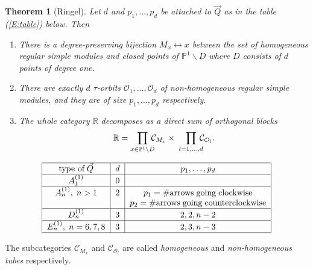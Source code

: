 \documentclass[a4paper,10pt]{amsart}
\newtheorem{theo}{\bf{Theorem}}[section]
\numberwithin{equation}{section}
\begin{document}
\vspace{.1in}

\begin{theo}[Ringel]\label{T:Ringelstructure} Let $d$ and $p_1, \ldots, p_d$ be attached to $\vec{Q}$ as in the table (\ref{E:table}) below. Then
\begin{enumerate}
\item[i)] There is a degree-preserving bijection $M_x \leftrightarrow x$ between the set of homogeneous regular simple modules and closed points of $\mathbb{P}^1 \backslash D$ where $D$ consists of $d$ points of degree one.
\item[ii)] There are exactly $d$ $\tau$-orbits $\mathcal{O}_1, \ldots, \mathcal{O}_d$ of non-homogeneous regular simple modules, and they are of size $p_1, \ldots, p_d$ respectively.
\item[iii)] The whole category $\mathbb{R}$ decomposes as a direct sum of orthogonal blocks
$$\mathbb{R} = \prod_{x \in \mathbb{P}^1\backslash D} \hspace{-.08in}\mathcal{C}_{M_x} \times\; \prod_{l=1, \ldots, d}\hspace{-.08in} \mathcal{C}_{\mathcal{O}_l}.$$
\end{enumerate}
\end{theo}

\vspace{.1in}

\begin{equation}\label{E:table}
\begin{tabular}{|c|c|c|}
\hline
type of\;$\vec{Q}$ & $d$ & $p_1, \ldots, p_d$\\
\hline
$A_1^{(1)}$ & 0 & \\
\hline
$A_n^{(1)}, \;n>1$ & 2 & $p_1=\# \mathrm{arrows\;going\;clockwise}$\\
& & $p_2=\# \mathrm{arrows\;going\;counterclockwise}$\\
\hline
$D_n^{(1)}$ & 3 & $2,2,n-2$\\
\hline
$E_n^{(1)},\; n=6,7,8$ & 3 & $2,3,n-3$\\
\hline
\end{tabular}
\end{equation}

\vspace{.15in}

The subcategories $\mathcal{C}_{M_x}$ and $\mathcal{C}_{\mathcal{O}_l}$ are called \textit{homogeneous} and \textit{non-homogeneous} \textit{tubes} respectively.

\vspace{.05in}
\end{document}
